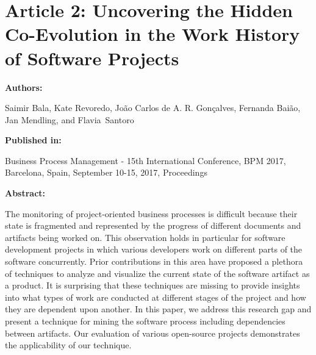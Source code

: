 \chapter{Article 2: Uncovering the Hidden Co-Evolution in the Work History of Software Projects}

{\bfseries \Large Authors:}

Saimir Bala, Kate Revoredo, 
Jo\~{a}o Carlos de A. R. Gon\c{c}alves,
Fernanda Bai\~{a}o,
Jan Mendling, and Flavia~Santoro \hfill

\bigskip

{\noindent\bfseries \Large Published in: \medskip}

Business Process Management - 15th International Conference, {BPM}
2017, Barcelona, Spain, September 10-15, 2017, Proceedings

\bigskip

{\noindent\bfseries \Large Abstract: \medskip}


The monitoring of project-oriented business processes is difficult because their state is fragmented and represented by the progress of different documents and artifacts being worked on. This observation holds in particular for software development projects in which various developers work on different parts of the software concurrently. Prior contributions in this area have proposed a plethora of techniques to analyze and visualize the current state of the software artifact as a product. It is surprising that these techniques are missing to provide insights into what types of work are conducted at different stages of the project and how they are dependent upon another. In this paper, we address this research gap and present a technique for mining the software process including dependencies between artifacts. Our evaluation of various open-source projects demonstrates the applicability of our technique. 


\pagebreak





